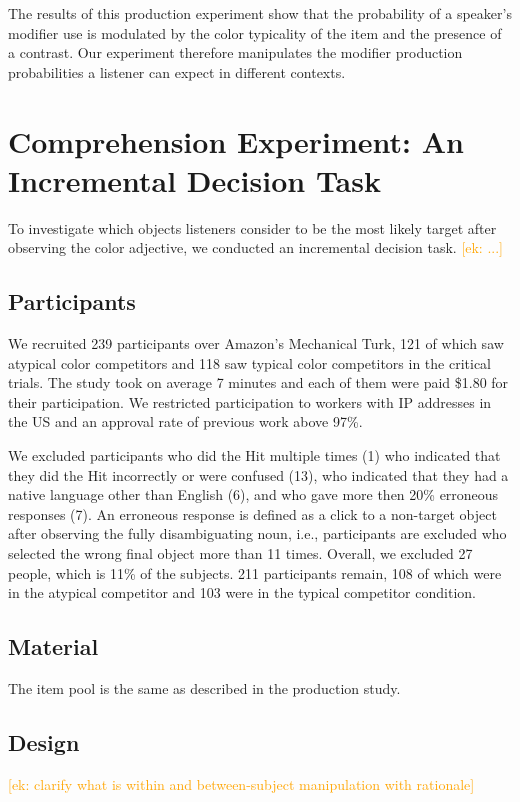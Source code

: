 \documentclass[10pt,letterpaper]{article}
\newcommand{\ek}[1]{\textcolor{Orange}{[ek: #1]}}
\begin{document}
The results of this production experiment show that the probability of a speaker's modifier use is modulated by the color typicality of the item and the presence of a contrast. Our experiment therefore manipulates the modifier production probabilities a listener can expect in different contexts.


\section{Comprehension Experiment: An Incremental Decision Task}
To investigate which objects listeners consider to be the most likely target after observing the color adjective, we conducted an incremental decision task. \ek{...}


\subsection{Participants}
We recruited 239 participants over Amazon's Mechanical Turk, 121 of which saw atypical color competitors and 118 saw typical color competitors in the critical trials. The study took on average 7 minutes and each of them were paid \$1.80 for their participation. We restricted participation to workers with IP addresses in the US and an approval rate of previous work above 97\%.

We excluded participants who did the Hit multiple times (1) who indicated that they did the Hit incorrectly or were confused (13), who indicated that they had a native language other than English (6), and who gave more then 20\% erroneous responses (7). An erroneous response is defined as a click to a non-target object after observing the fully disambiguating noun, i.e., participants are excluded who selected the wrong final object more than 11 times. Overall, we excluded 27 people, which is 11\% of the subjects. 211 participants remain, 108 of which were in the atypical competitor and 103 were in the typical competitor condition. 


\subsection{Material}
The item pool is the same as described in the production study.


\subsection{Design}
\ek{clarify what is within and between-subject manipulation with rationale}
\end{document}
